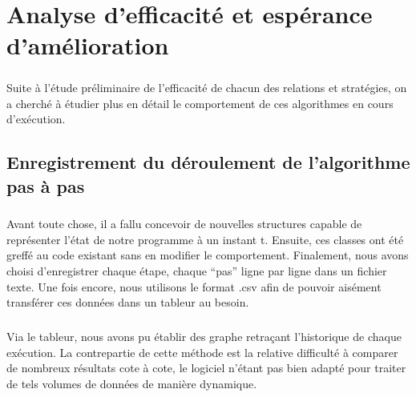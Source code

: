 \documentclass[a4paper,10pt]{report}
\begin{document}

\chapter{Analyse d'efficacité et espérance d'amélioration}

\paragraph{}
  Suite à l'étude préliminaire de l'efficacité de chacun des relations et stratégies, on a cherché à étudier
plus en détail le comportement de ces algorithmes en cours d'exécution.

\section{Enregistrement du déroulement de l'algorithme pas à pas}

\paragraph{}
  Avant toute chose, il a fallu concevoir de nouvelles structures capable de représenter l'état de notre programme
à un instant t. Ensuite, ces classes ont été greffé au code existant sans en modifier le comportement. Finalement,
nous avons choisi d'enregistrer chaque étape, chaque ``pas'' ligne par ligne dans un fichier texte. Une fois encore,
nous utilisons le format .csv afin de pouvoir aisément transférer ces données dans un tableur au besoin.

\paragraph{}
  Via le tableur, nous avons pu établir des graphe retraçant l'historique de chaque exécution. La contrepartie de
cette méthode est la relative difficulté à comparer de nombreux résultats cote à cote, le logiciel n'étant pas
bien adapté pour traiter de tels volumes de données de manière dynamique.
\end{document}
